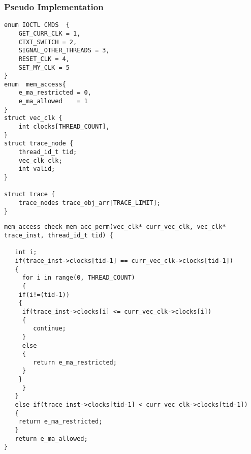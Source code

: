 \documentclass[11pt]{article}
\newcommand{\background}[5]{%
  \begin{pgfonlayer}{background}
    \path (#1.west |- #2.north)+(-0.5,0.5) node (a1) {};
    \path (#3.east |- #4.south)+(+0.5,-0.25) node (a2) {};
    \path[fill=yellow!20,rounded corners, draw=black!50, dashed]
      (a1) rectangle (a2);
    \path (a1.east |- a1.south)+(0.8,-0.3) node (u1)[texto]
      {\scriptsize\textit{#5}};
  \end{pgfonlayer}}
\begin{document}


\newpage
\subsubsection*{Pseudo Implementation}
\begin{lstlisting}[title=Data Types Section used by user space and kernel space, style=customc]
enum IOCTL CMDS  { 
	GET_CURR_CLK = 1, 
  	CTXT_SWITCH = 2, 
  	SIGNAL_OTHER_THREADS = 3,
  	RESET_CLK = 4,
  	SET_MY_CLK = 5
}
enum  mem_access{
	e_ma_restricted = 0,
	e_ma_allowed 	= 1
} 
struct vec_clk {
	int clocks[THREAD_COUNT],
}
struct trace_node {
	thread_id_t tid;
	vec_clk clk;
	int valid;
}

struct trace {
	trace_nodes trace_obj_arr[TRACE_LIMIT];
}
\end{lstlisting}

\begin{lstlisting}[title=Check Permission for memory access, style=customc]
mem_access check_mem_acc_perm(vec_clk* curr_vec_clk, vec_clk* trace_inst, thread_id_t tid) {

   int i;
   if(trace_inst->clocks[tid-1] == curr_vec_clk->clocks[tid-1]) 
   {
     for i in range(0, THREAD_COUNT) 
     {
	if(i!=(tid-1)) 
	{
	 if(trace_inst->clocks[i] <= curr_vec_clk->clocks[i]) 
	 {
	 	continue;
	 }
	 else 
	 {
	 	return e_ma_restricted;
	 }
	}
     }
   }
   else if(trace_inst->clocks[tid-1] < curr_vec_clk->clocks[tid-1]) 
   {
   	return e_ma_restricted;
   }
   return e_ma_allowed;
}

\end{lstlisting}
\end{document}
